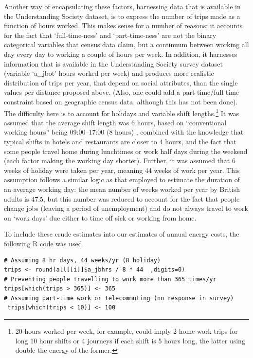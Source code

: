 Another way of encapsulating these
factors, harnessing data that is available in the Understanding Society dataset,
is to express the number of trips made as a function of hours worked.
This makes sense for a number of reasons: it accounts for the fact that
`full-time-ness' and `part-time-ness' are not the binary categorical variables
that census data claim, but a continuum between working all day every day to
working a couple of hours per week. In addition, it harnesses information that
is available in the Understanding Society survey dataset (variable `a\_jbot'
hours worked per week) and produces more realistic distribution of
trips per year, that depend on social attributes,
than the single values per distance proposed above. (Also, one could
add a part-time/full-time constraint based on geographic census data,
although this has not been done).
The difficulty here is to account for holidays and variable shift
lengths.\footnote{20
hours worked per week, for example, could
imply 2 home-work trips for long 10 hour shifts or 4 journeys if each
shift is 5 hours long, the latter using double the energy of the former.
}
It was assumed that the average shift length was 6 hours, based on
``conventional working hours'' being 09:00--17:00 (8 hours)
\citep{harrington2001health}, combined with the knowledge that typical shifts
in hotels and restaurants are closer to 4 hours, and the fact that some people
travel home during lunchtimes or work half days during the weekend (each
factor making the working day shorter).
Further, it was assumed that 6 weeks of holiday were taken per year,
meaning 44 weeks of work per year.
This assumption follows a similar logic as that employed to estimate
the duration of an average working day: the mean number of weeks worked per
year by British adults is 47.5, but this number was reduced to account for
the fact that people change jobs (leaving a period of unemployment) and
do not always travel to work on `work days' due either to time off sick
or working from home.

To include these crude estimates into our estimates of annual energy costs,
the following R code was used.
\begin{lstlisting}[float=h, caption={Code used to
translate hours worked per week into number of trips per year}, label=ctrpyr]
# Assuming 8 hr days, 44 weeks/yr (8 holiday)
trips <- round(all[[i]]$a_jbhrs / 8 * 44  ,digits=0)
# Preventing people travelling to work more than 365 times/yr
trips[which(trips > 365)] <- 365
# Assuming part-time work or telecommuting (no response in survey)
 trips[which(trips < 10)] <- 100
\end{lstlisting}

